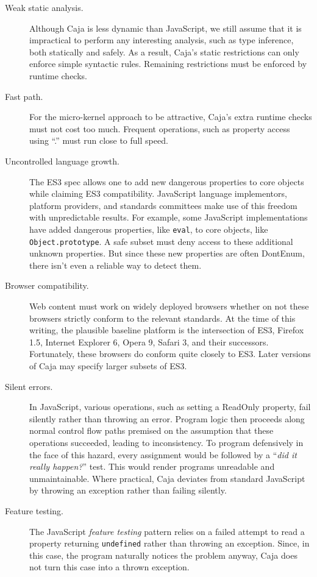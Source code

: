 \documentclass[letterpaper,twocolumn,10pt]{article}
\newcommand{\code}[1]{{\tt {#1}}}              %
\begin{document}
\begin{description}
  \item[Weak static analysis.] Although Caja is less dynamic than JavaScript, 
  we still assume that it is impractical to perform any interesting analysis, 
  such as type inference, both statically and safely. As a result, Caja's 
  static restrictions can only enforce simple syntactic rules. Remaining 
  restrictions must be enforced by runtime checks.
  
  \item[Fast path.] For the micro-kernel approach to be attractive, Caja's 
  extra runtime checks must not cost too much. Frequent operations, such as 
  property access using ``.'' must run close to full speed.
  
  \item[Uncontrolled language growth.] The ES3 spec allows one to add new 
  dangerous properties to core objects while claiming ES3 compatibility. 
  JavaScript language implementors, platform providers, and standards 
  committees make use of this freedom with unpredictable results. For 
  example, some JavaScript implementations have added dangerous properties, 
  like \code{eval}, to core objects, like \code{Object.prototype}. A safe 
  subset must deny access to these additional unknown properties. But since 
  these new properties are often DontEnum, there isn't even a reliable way to 
  detect them.
  
  \item[Browser compatibility.] Web content must work on widely deployed 
  browsers whether on not these browsers strictly conform to the relevant 
  standards. At the time of this writing, the plausible baseline platform is 
  the intersection of ES3, Firefox 1.5, Internet Explorer 6, Opera 9, Safari 
  3, and their successors. Fortunately, these browsers do conform quite 
  closely to ES3. Later versions of Caja may specify larger subsets of ES3.
  
  \item[Silent errors.] In JavaScript, various operations, such as setting a 
  ReadOnly property, fail silently rather than throwing an error. Program 
  logic then proceeds along normal control flow paths premised on the 
  assumption that these operations succeeded, leading to inconsistency. To 
  program defensively in the face of this hazard, every assignment would be 
  followed by a ``\emph{did it really happen?}'' test. This would render 
  programs unreadable and unmaintainable. Where practical, Caja deviates from 
  standard JavaScript by throwing an exception rather than failing silently.
  
  \item[Feature testing.] The JavaScript \emph{feature testing} pattern 
  relies on a failed attempt to read a property returning \code{undefined} 
  rather than throwing an exception. Since, in this case, the program 
  naturally notices the problem anyway, Caja does not turn this case into a 
  thrown exception.
    
\end{description}
\end{document}
